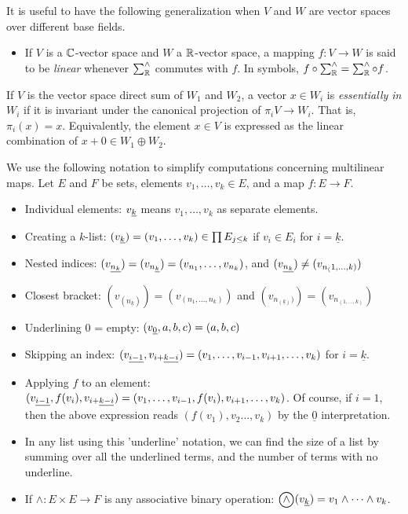\documentclass[../main-v2-manifolds.tex]{subfiles}
\begin{document}
It is useful to have the following generalization when $V$ and $W$ are vector spaces over different base fields.
\begin{itemize}
\item If $V$ is a ${\mathbb{C}}$-vector space and $W$ a $\mathbb{R}$-vector space, a mapping $f: V\to W$ is said to be \emph{linear} whenever $\sum^\wedge_{\mathbb{R}}$ commutes with $f$. In symbols, $f\circ \sum^\wedge_{\mathbb{R}} = \sum^\wedge_{\mathbb{R}} \circ f$.
\end{itemize}
If $V$ is the vector space direct sum of $W_1$ and $W_2$, a vector $x\in W_i$ is \emph{essentially in $W_i$} if it is invariant under the canonical projection of $\pi_i V\to W_i$. That is, $\pi_i (x) = x$. Equivalently, the element $x\in V$ is expressed as the linear combination of $x + 0\in W_1\oplus W_2$.

We use the following notation to simplify computations concerning multilinear maps. Let $E$ and $F$ be sets, elements $v_1,\ldots, v_k\in E$, and a map $f: E\to F$.
\begin{itemize}
    \item Individual elements: $\UL{v}[k]$ means $v_1,\ldots,v_k$ as separate elements. 
    \item Creating a $k$-list: $(\UL{v}[k]) = (v_1,\ldots, v_k)\in \prod E_{j\leq k}$ if $v_i\in E_i$ for $i = \underline{k}$.
    \item Nested indices: $(\UL{v}[n_k]) = (v_{n_{\underline{k}}}) = (v_{n_1},\ldots, v_{n_k})$, and $(\UL{v}[n_k]) \neq (v_{n_(1,\ldots,k)})$
    \item Closest bracket: $(v_{(n_{\underline{k}})}) = (v_{(n_1, \ldots, n_k)})$ and $(v_{n_{(\underline{k})})}) = (v_{n_{(1, \ldots, k)}})$
    \item Underlining $0$ = empty: $(\UL{v}[0], a,b,c) = (a,b,c)$
    \item Skipping an index: $(\UL{v}[i-1],\UL{v}[i+][k-i]) = (v_{1},\ldots, v_{i-1},v_{i+1},\ldots, v_{k})$ for $i = \underline{k}$.
    \item Applying $f$ to an element: $(\UL{v}[i-1], f(v_{i}), \UL{v}[i+][k-i]) = (v_1,\ldots, v_{i-1}, f(v_i), v_{i+1}, \ldots, v_k)$. Of course, if $i=1$, then the above expression reads $(f(v_1), v_2\ldots, v_k)$ by the $\underline{0}$ interpretation.
    \item In any list using this 'underline' notation, we can find the size of a list by summing over all the underlined terms, and the number of terms with no underline.
    \item If $\wedge: E\times E\to F$ is any associative binary operation: $\bigowedge(\UL{v}[k]) = v_1\wedge\cdots \wedge v_k$.
\end{itemize}
\end{document}

